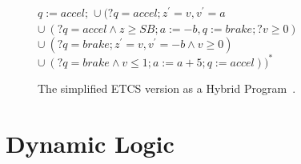 \begin{figure}[ht!]
	\(q := accel;\)\newline
	\(\cup~(?q = accel; z^{\prime}= v, v^{\prime}= a\) \newline
	\(\cup~(?q = accel \wedge z \geq SB; a := -b, q:= brake; ?v \geq 0)\) \newline
	\(\cup~(?q = brake; z^{\prime}=v, v^{\prime}= -b \wedge v \geq 0)\) \newline
	\(\cup~(?q = brake \wedge v \leq 1; a := a+5; q := accel))^\ast\)
	\caption{The simplified ETCS version as a Hybrid Program~\cite{platzer2010b}.}
	\label{fig:etcs_hp}
\end{figure}

\section{Dynamic Logic}
\label{sec:pre:DL}
